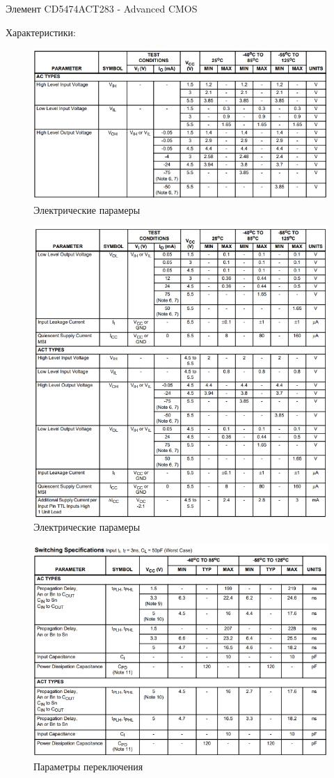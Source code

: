 Элемент CD5474ACT283 - Advanced CMOS

Характеристики:

\begin{figure}[H]
	\centering
	\includegraphics[width=0.95\linewidth]{imgs/5/ti1}
	\caption{Электрические парамеры}
	\label{fig:5_ti1}
\end{figure}

\begin{figure}[H]
	\centering
	\includegraphics[width=0.95\linewidth]{imgs/5/ti2}
	\caption{Электрические парамеры}
	\label{fig:5_ti2}
\end{figure}

\begin{figure}[H]
	\centering
	\includegraphics[width=0.95\linewidth]{imgs/5/ti3}
	\caption{Параметры переключения}
	\label{fig:5_ti3}
\end{figure}
